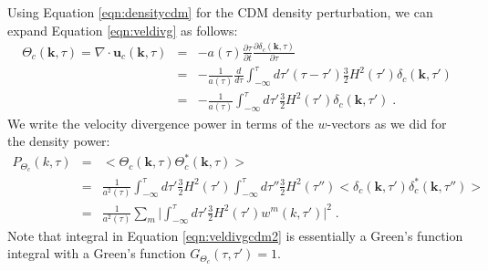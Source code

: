 \documentclass{aastex}
\begin{document}
Using Equation \eqref{eqn:densitycdm} for the CDM density perturbation, we can expand
Equation \eqref{eqn:veldivg} as follows:
\begin{equation}\label{eqn:veldivgcdm}
\begin{array}{rcl}
  \Theta_c(\mathbf{k}, \tau) = \nabla \cdot \mathbf{u}_c(\mathbf{k},\tau) &=&-a(\tau) \frac{ \partial \tau }{ \partial t }
                                \frac{ \partial \delta_c (\mathbf{k},\tau)}{\partial
                                \tau} \\[1em]
  &=& -\frac{1}{a(\tau)} \frac{d}{d\tau} \int_{-\infty}^{\tau} d\tau' (\tau
      - \tau') \frac{3}{2} H^2(\tau') \delta_c(\mathbf{k},\tau') \\[1em]
 &=& - \frac{1}{a(\tau)} \int_{-\infty}^{\tau} d\tau' \frac{3}{2} H^2(\tau')
     \delta_c(\mathbf{k},\tau')\;.
\end{array} 
\end{equation} 
We write the velocity divergence power in terms of the $w$-vectors as we did for the density power:
\begin{equation} \label{eqn:veldivgcdm2}
\begin{array}{rcl} 
  P_{\Theta_c}( k,\tau ) &=& < \Theta_c(\mathbf{k},\tau) \Theta_c^*(\mathbf{k},\tau)>  \\[1em]
  &=& \frac{1}{a^2(\tau)} \int_{-\infty}^{\tau} d\tau' \frac{3}{2}
      H^2(\tau') \int_{-\infty}^{\tau} d\tau'' \frac{3}{2} H^2(\tau'')
      < \delta_c(\mathbf{k},\tau') \delta_c^*(\mathbf{k},\tau'') >\\[1em]
  &=& \frac{1}{a^2(\tau)} \sum_{m} \bigg| \int_{-\infty}^{\tau} d\tau'
      \frac{3}{2} H^2(\tau') w^m(k, \tau') \bigg|^2\;.
\end{array}
\end{equation}
Note that integral in Equation
\eqref{eqn:veldivgcdm2} is essentially a Green's function integral with
a Green's function $G_{\Theta_c}(\tau, \tau' ) = 1$. 

\end{document}
